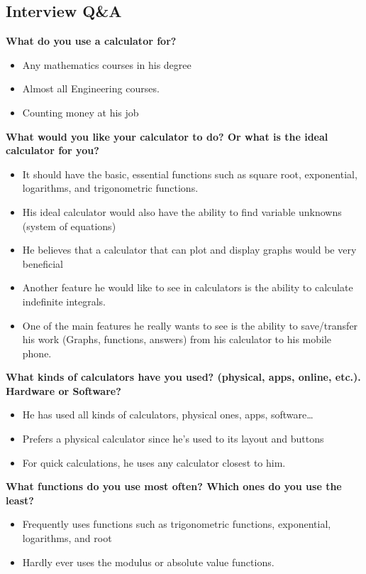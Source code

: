 \documentclass{article}
\begin{document}
\subsection*{Interview Q\&A}
\textbf{What do you use a calculator for?}
\begin{itemize}
\itemsep0em 
\item Any mathematics courses in his degree
\item Almost all Engineering courses.
\item Counting money at his job 
\end{itemize}

\textbf{What would you like your calculator to do? Or what is the ideal calculator for you?}
\begin{itemize}
\itemsep0em 
\item It should have the basic, essential functions such as square root, exponential, logarithms, and trigonometric functions.
\item His ideal calculator would also have the ability to find variable unknowns (system of equations) 
\item He believes that a calculator that can plot and display graphs would be very beneficial
\item Another feature he would like to see in calculators is the ability to calculate indefinite integrals.
\item One of the main features he really wants to see is the ability to save/transfer his work (Graphs, functions, answers) from his calculator to his mobile phone.
\end{itemize}

\textbf{What kinds of calculators have you used? (physical, apps, online, etc.). Hardware or Software?}
\begin{itemize}
\itemsep0em 
\item He has used all kinds of calculators, physical ones, apps, software…
\item Prefers a physical calculator since he’s used to its layout and buttons
\item For quick calculations, he uses any calculator closest to him.
\end{itemize}

\textbf{What functions do you use most often? Which ones do you use the least?}
\begin{itemize}
\itemsep0em 
\item Frequently uses functions such as trigonometric functions, exponential, logarithms, and root
\item Hardly ever uses the modulus or absolute value functions.
\end{itemize}
\end{document}
